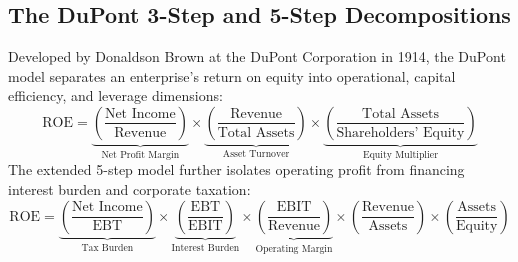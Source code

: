 \subsection{The DuPont 3-Step and 5-Step Decompositions}
Developed by Donaldson Brown at the DuPont Corporation in 1914, the DuPont model separates an enterprise's return on equity into operational, capital efficiency, and leverage dimensions:
\begin{equation}
\text{ROE} = \underbrace{\left(\frac{\text{Net Income}}{\text{Revenue}}\right)}_{\text{Net Profit Margin}} \times \underbrace{\left(\frac{\text{Revenue}}{\text{Total Assets}}\right)}_{\text{Asset Turnover}} \times \underbrace{\left(\frac{\text{Total Assets}}{\text{Shareholders' Equity}}\right)}_{\text{Equity Multiplier}}
\label{eq:dupont_3step}
\end{equation}
The extended 5-step model further isolates operating profit from financing interest burden and corporate taxation:
\begin{equation}
\text{ROE} = \underbrace{\left(\frac{\text{Net Income}}{\text{EBT}}\right)}_{\text{Tax Burden}} \times \underbrace{\left(\frac{\text{EBT}}{\text{EBIT}}\right)}_{\text{Interest Burden}} \times \underbrace{\left(\frac{\text{EBIT}}{\text{Revenue}}\right)}_{\text{Operating Margin}} \times \left(\frac{\text{Revenue}}{\text{Assets}}\right) \times \left(\frac{\text{Assets}}{\text{Equity}}\right)
\label{eq:dupont_5step}
\end{equation}

